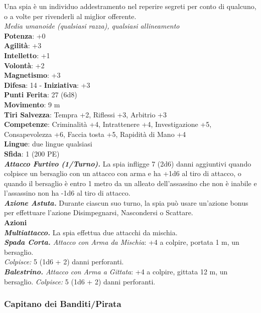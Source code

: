\begin{multicols}{2}
Una spia è un individuo addestramento nel reperire segreti per conto di qualcuno, o a volte per rivenderli al miglior offerente.\\
\emph{Media umanoide (qualsiasi razza), qualsiasi allineamento}\\
\textbf{Potenza}: +0\\
\textbf{Agilità}: +3\\
\textbf{Intelletto}: +1\\
\textbf{Volontà}: +2\\
\textbf{Magnetismo}: +3\\
\textbf{Difesa}: 14 - \textbf{Iniziativa}: +3\\
\textbf{Punti Ferita}: 27 (6d8)\\
\textbf{Movimento}: 9 m\\
\textbf{Tiri Salvezza}: Tempra +2, Riflessi +3, Arbitrio +3 \\
\textbf{Competenze}: Criminalità +4, Intrattenere +4, Investigazione +5, Consapevolezza +6, Faccia tosta +5, Rapidità di Mano +4\\
\textbf{Lingue}: due lingue qualsiasi\\
\textbf{Sfida}: 1 (200 PE)\smallskip\\
\emph{\textbf{Attacco Furtivo (1/Turno).}} La spia infligge 7 (2d6) danni aggiuntivi quando colpisce un bersaglio con un attacco con arma e ha +1d6 al tiro di attacco, o quando il bersaglio è entro 1 metro da un alleato dell'assassino che non è inabile e l'assassino non ha -1d6 al tiro di attacco.\\
\emph{\textbf{Azione Astuta.}} Durante ciascun suo turno, la spia può usare un'azione bonus per effettuare l'azione Disimpegnarsi, Nascondersi o Scattare.\\
\smallskip\textbf{Azioni} \\
\emph{\textbf{Multiattacco.}} La spia effettua due attacchi da mischia. \\
\emph{\textbf{Spada Corta.} Attacco con Arma da Mischia}: +4 a colpire, portata 1 m, un bersaglio.\\
\emph{Colpisce:} 5 (1d6 + 2) danni perforanti.\\
\emph{\textbf{Balestrino.} Attacco con Arma a Gittata}: +4 a colpire, gittata 12 m, un bersaglio. \emph{Colpisce:} 5 (1d6 + 2) danni perforanti.\\


\subsubsection{Capitano dei Banditi/Pirata}


\end{multicols}
